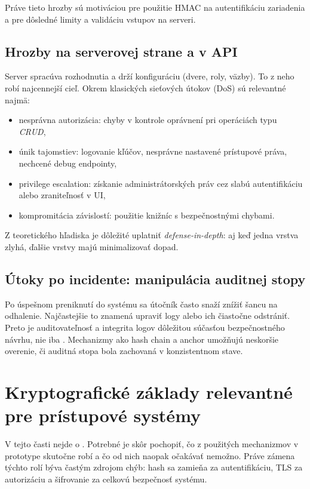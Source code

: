 \documentclass[journal,a4paper,onecolumn]{IEEEtran}
\begin{document}
Práve tieto hrozby sú motiváciou pre použitie HMAC na autentifikáciu zariadenia a pre dôsledné limity a validáciu vstupov na serveri.

\subsection{Hrozby na serverovej strane a v API}

Server spracúva rozhodnutia a drží konfiguráciu (dvere, roly, väzby). To z neho robí najcennejší cieľ. Okrem klasických sieťových útokov (DoS) sú relevantné najmä:

\begin{itemize}[leftmargin=*,itemsep=2pt]
  \item nesprávna autorizácia: chyby v kontrole oprávnení pri operáciách typu \emph{CRUD},
  \item únik tajomstiev: logovanie kľúčov, nesprávne nastavené prístupové práva, nechcené debug endpointy,
  \item privilege escalation: získanie administrátorských práv cez slabú autentifikáciu alebo zraniteľnosť v UI,
  \item kompromitácia závislostí: použitie knižníc s bezpečnostnými chybami.
\end{itemize}

Z teoretického hľadiska je dôležité uplatniť \emph{defense-in-depth}: aj keď jedna vrstva zlyhá, ďalšie vrstvy majú minimalizovať dopad.

\subsection{Útoky po incidente: manipulácia auditnej stopy}

Po úspešnom preniknutí do systému sa útočník často snaží znížiť šancu na odhalenie. Najčastejšie to znamená upraviť logy alebo ich čiastočne odstrániť. Preto je auditovateľnosť a integrita logov dôležitou súčasťou bezpečnostného návrhu, nie iba . Mechanizmy ako hash chain a anchor umožňujú neskoršie overenie, či auditná stopa bola zachovaná v konzistentnom stave.

\section{Kryptografické základy relevantné pre prístupové systémy}

V tejto časti nejde o . Potrebné je skôr pochopiť, čo z použitých mechanizmov v prototype skutočne robí a čo od nich naopak očakávať nemožno. Práve zámena týchto rolí býva častým zdrojom chýb: hash sa zamieňa za autentifikáciu, TLS za autorizáciu a šifrovanie za celkovú bezpečnosť systému.
\end{document}
